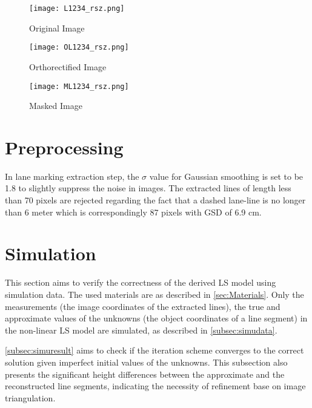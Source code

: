 \begin{figure}%
  \parbox{.475\linewidth}{
    \centering
    \texttt{[image: L1234\_rsz.png]}
    \caption{\small Original Image}
    \label{fig:OriImg}
  }
  \quad
  \parbox{.475\linewidth}{
    \centering
    \texttt{[image: OL1234\_rsz.png]}
    \caption{\small Orthorectified Image}
    \label{fig:OrthoImg}
  }
  \centering
  \parbox{.7\linewidth}{
    \texttt{[image: ML1234\_rsz.png]}
    \caption{\small Masked Image}
    \label{fig:MaskedImg}
  }
\end{figure}

\clearpage
\section{Preprocessing}
\label{sec:preprocessing}

In lane marking extraction step, the $\sigma$ value for Gaussian smoothing is set to be 1.8 %
to slightly suppress the noise in images.
The extracted lines of length less than 70 pixels are rejected %
regarding the fact that a dashed lane-line is no longer than 6 meter which is correspondingly 87 pixels with GSD of 6.9 cm.

\section{Simulation}
\label{sec:simulation}
This section aims to verify the correctness of the derived LS model using simulation data. The used materials are as described in \cref{sec:Materials}. Only the measurements (the image coordinates of the extracted lines), the true and approximate values of the unknowns (the object coordinates of a line segment) in the non-linear LS model are simulated, as described in \cref{subsec:simudata}.

\cref{subsec:simuresult} aims to check if the iteration scheme converges to the correct solution given imperfect initial values of the unknowns. This subsection also presents the significant height differences between the approximate and the reconstructed line segments, indicating the necessity of refinement base on image triangulation.

